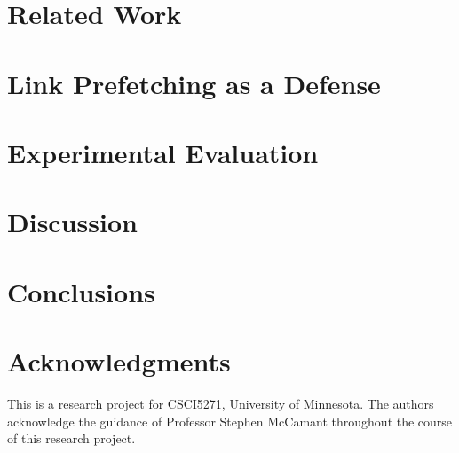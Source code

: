 \documentclass{sig-alternate-05-2015}
\begin{document}
\section{Related Work}


\section{Link Prefetching as a Defense}


\section{Experimental Evaluation}


\section{Discussion}


\section{Conclusions}



\section{Acknowledgments}
This is a research project for CSCI5271, University of Minnesota.
The authors acknowledge the guidance of Professor Stephen McCamant
throughout the course of this research project.



\end{document}
